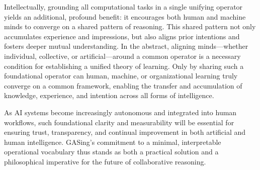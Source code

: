 Intellectually, grounding all computational tasks in a single unifying operator yields an additional, profound benefit: it encourages both human and machine minds to converge on a shared pattern of reasoning. This shared pattern not only accumulates experience and impressions, but also aligns prior intentions and fosters deeper mutual understanding. In the abstract, aligning minds—whether individual, collective, or artificial—around a common operator is a necessary condition for establishing a unified theory of learning. Only by sharing such a foundational operator can human, machine, or organizational learning truly converge on a common framework, enabling the transfer and accumulation of knowledge, experience, and intention across all forms of intelligence.

As AI systems become increasingly autonomous and integrated into human workflows, such foundational clarity and measurability will be essential for ensuring trust, transparency, and continual improvement in both artificial and human intelligence. GASing’s commitment to a minimal, interpretable operational vocabulary thus stands as both a practical solution and a philosophical imperative for the future of collaborative reasoning.
